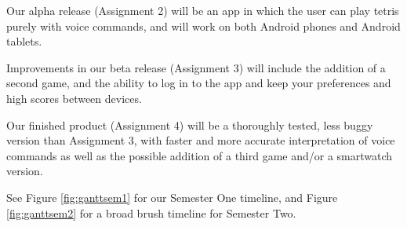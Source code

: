 \documentclass[11pt, oneside]{article}
\begin{document}
Our alpha release (Assignment 2) will be an app in which the user can
play tetris purely with voice commands, and will work on both Android
phones and Android tablets.

Improvements in our beta release (Assignment 3) will include the
addition of a second game, and the ability to log in to the app and
keep your preferences and high scores between devices.

Our finished product (Assignment 4) will be a thoroughly tested, less
buggy version than Assignment 3, with faster and more accurate
interpretation of voice commands as well as the possible addition of a
third game and/or a smartwatch version.

See Figure \ref{fig:ganttsem1} for our Semester One timeline, and
Figure \ref{fig:ganttsem2} for a broad brush timeline for Semester Two.
\end{document}
